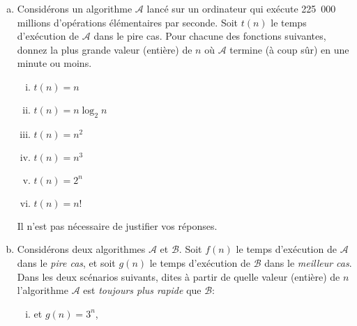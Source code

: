 \documentclass{article}
\newcommand{\A}{\mathcal{A}}                     %
\newcommand{\B}{\mathcal{B}}                     %
\begin{document}
\pagebreak


\begin{question}
  \begin{enumerate}[(a)]
  \setlength\itemsep{15pt}

  \item Considérons  un algorithme $\A$ lancé
    sur un ordinateur qui exécute 225~000 millions d'opérations
    élémentaires par seconde. Soit $t(n)$ le temps d'exécution de $\A$
    dans le pire cas. Pour chacune des fonctions suivantes, donnez la
    plus grande valeur (entière) de $n$ où $\A$ termine (à coup sûr)
    en une minute ou moins.
    \begin{multicols}{2}
      \begin{enumerate}[(i)]
      \setlength\itemsep{5pt}
        
      \item $t(n) = n$
        
      \item $t(n) = n \log_2 n$
          
      \item $t(n) = n^2$
          
      \item $t(n) = n^3$
          
      \item $t(n) = 2^n$
        
      \item $t(n) = n!$
      \end{enumerate}
    \end{multicols} 
    Il n'est pas nécessaire de justifier vos réponses.
        
  \item Considérons  deux algorithmes $\A$ et
    $\B$. Soit $f(n)$ le temps d'exécution de $\A$ dans le \emph{pire
    cas}, et soit $g(n)$ le temps d'exécution de $\B$ dans le
    \emph{meilleur cas}. Dans les deux scénarios suivants, dites à
    partir de quelle valeur (entière) de $n$ l'algorithme $\A$ est
    \emph{toujours plus rapide} que $\B$:\medskip

    \begin{enumerate}[(i)]
    \setlength\itemsep{5pt}

    \item {} et $g(n) =
      3^n$,


\end{enumerate}
\end{enumerate}
\end{question}
\end{document}
